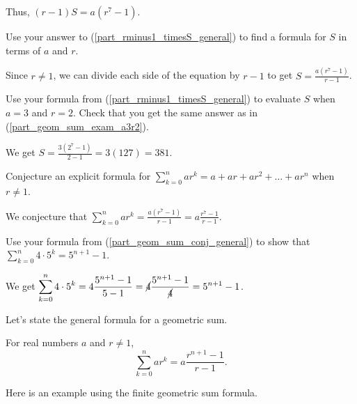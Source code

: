 \begin{exam}
\begin{apart}
\begin{soln}
                    Thus, $(r-1)S = a(r^7-1)$.
                \end{soln}            
            \item \label{part_geom_sum_derive_general} Use your answer to (\ref{part_rminus1_timesS_general}) to find a formula for $S$ in terms of $a$ and $r$. 
                \begin{soln}
                    Since $r \neq 1$, we can divide each side of the equation by $r-1$ to get $\displaystyle S = \frac{a(r^7-1)}{r-1}$.
                \end{soln}
            \item Use your formula from (\ref{part_rminus1_timesS_general}) to evaluate $S$ when $a = 3$ and $r=2$.  Check that you get the same answer as in (\ref{part_geom_sum_exam_a3r2}).
                \begin{soln}
                    We get $\displaystyle S = \frac{3(2^7-1)}{2-1}= 3(127) = 381$.
                \end{soln}
            \item \label{part_geom_sum_conj_general} Conjecture an explicit formula for $\displaystyle \sum_{k=0}^nar^k = a + ar + ar^2 + \ldots + ar^n$ when $r \neq 1$. 
                \begin{soln}
                    We conjecture that $\displaystyle \sum_{k=0}^nar^k = \frac{a(r^7-1)}{r-1} = a\frac{r^7-1}{r-1}$.
                \end{soln}
            \item Use your formula from (\ref{part_geom_sum_conj_general}) to show that $\displaystyle \sum_{k=0}^n4\cdot5^k = 5^{n+1}-1$.   
                \begin{soln}
                    We get $\displaystyle \sum_{k=0}^n4\cdot5^k = 4\frac{5^{n+1}-1}{5-1}= \cancel{4}\frac{5^{n+1}-1}{\cancel{4}} = 5^{n+1} - 1$.
                \end{soln}
        \end{apart}
\end{exam}

Let's state the general formula for a geometric sum.

\begin{thm}
\label{thm_geom_sum_finite}
    For real numbers $a$ and $r \neq 1$,
        $$\sum_{k=0}^nar^k=a \frac{r^{n+1}-1}{r-1}.$$
\end{thm}

Here is an example using the finite geometric sum formula.

